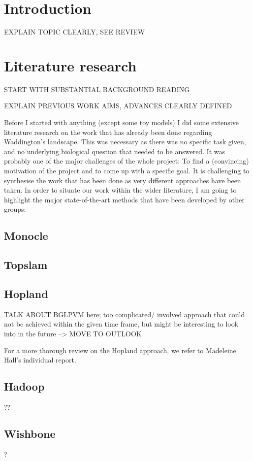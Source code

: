 \documentclass[journal, a4paper]{IEEEtran}
\begin{document}

\section{Introduction}

EXPLAIN TOPIC CLEARLY, SEE REVIEW 

\section{Literature research}

START WITH SUBSTANTIAL BACKGROUND READING

EXPLAIN PREVIOUS WORK
AIMS, ADVANCES CLEARLY DEFINED

Before I started with anything (except some toy models) I did some extensive literature research on the work that has already been done regarding Waddington's landscape. This was necessary as there was no specific task given, and no underlying biological question that needed to be answered. It was probably one of the major challenges of the whole project: To find a (convincing) motivation of the project and to come up with a specific goal.
It is challenging to synthesise the work that has been done as very different approaches have been taken. In order to situate our work within the wider literature, I am going to highlight the major state-of-the-art methods that have been developed by other groups:

\subsection{Monocle}
\subsection{Topslam}
\subsection{Hopland}
TALK ABOUT BGLPVM here; too complicated/ involved approach that could not be achieved within the given time frame, but might be interesting to look into in the future --> MOVE TO OUTLOOK

For a more thorough review on the Hopland approach, we refer to Madeleine Hall's individual report.
\subsection{Hadoop}??
\subsection{Wishbone}?
\end{document}
